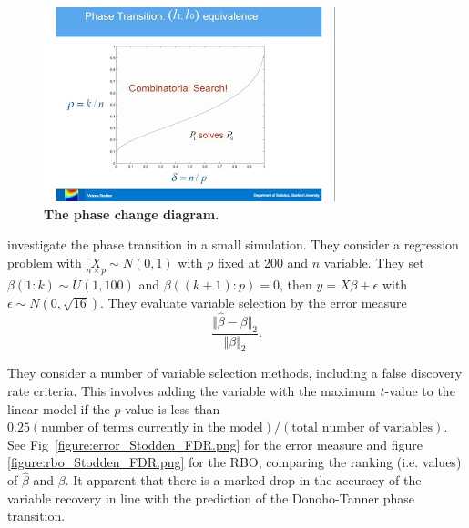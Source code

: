 \documentclass[10pt,letterpaper]{article}
\begin{document}
\begin{figure}[tbhp] 
 \begin{adjustwidth}{-1.00in}{0in}
    \centering
    \includegraphics[totalheight=6cm]{./figs/phase-diagram-equivalence.png} 
    \caption{{\bf The phase change diagram.}}
    \label{figure:phase-diagram-equivalence.png} 
    \vspace{4ex}
  \end{adjustwidth}
\end{figure}


\cite{Donoho.and.Stodden.2006} investigate the phase transition in a small simulation.  They consider a regression
problem with $\underset{n\times p}{X}\sim N(0,1)$ with $p$ fixed at 200 and $n$ variable.  They set
$\beta(1:k) \sim U(1,100)$ and $\beta((k+1):p) =0$, then $y= X\beta + \epsilon$ with $\epsilon \sim N(0,\sqrt{16})$. They
evaluate variable selection by the error measure
$$\frac{\Vert\hat{\beta}-\beta\Vert_2}{\Vert\beta\Vert_2}.$$

They consider a number of variable selection methods, including a false discovery rate criteria. This involves adding
the variable with the maximum $t$-value to the linear model if the $p$-value is less than 
$0.25(\text{number of  terms  currently  in  the  model})/(\text{total  number  of  variables})$.  
See Fig~\ref{figure:error_Stodden_FDR.png} for the error measure and
figure \ref{figure:rbo_Stodden_FDR.png} for the RBO, comparing the ranking (i.e. values) of $\hat{\beta}$ and $\beta$.
It apparent that there is a marked drop in the accuracy of the variable recovery in line with the prediction of the
Donoho-Tanner phase transition.
\end{document}
